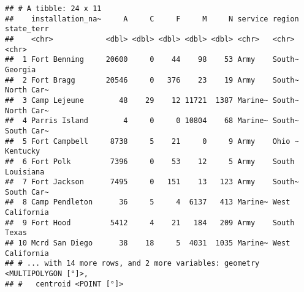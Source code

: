 \documentclass[
]{article}
\begin{document}
\begin{verbatim}
## # A tibble: 24 x 11
##    installation_na~     A     C     F     M     N service region state_terr
##    <chr>            <dbl> <dbl> <dbl> <dbl> <dbl> <chr>   <chr>  <chr>     
##  1 Fort Benning     20600     0    44    98    53 Army    South~ Georgia   
##  2 Fort Bragg       20546     0   376    23    19 Army    South~ North Car~
##  3 Camp Lejeune        48    29    12 11721  1387 Marine~ South~ North Car~
##  4 Parris Island        4     0     0 10804    68 Marine~ South~ South Car~
##  5 Fort Campbell     8738     5    21     0     9 Army    Ohio ~ Kentucky  
##  6 Fort Polk         7396     0    53    12     5 Army    South  Louisiana 
##  7 Fort Jackson      7495     0   151    13   123 Army    South~ South Car~
##  8 Camp Pendleton      36     5     4  6137   413 Marine~ West   California
##  9 Fort Hood         5412     4    21   184   209 Army    South  Texas     
## 10 Mcrd San Diego      38    18     5  4031  1035 Marine~ West   California
## # ... with 14 more rows, and 2 more variables: geometry <MULTIPOLYGON [°]>,
## #   centroid <POINT [°]>
\end{verbatim}
\end{document}
